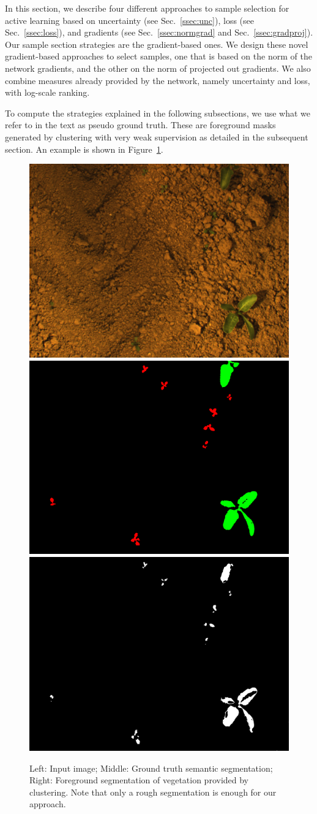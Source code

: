 \documentclass[letterpaper, 10 pt, conference]{ieeeconf}  %
\def\secref#1{Sec.~\ref{#1}}
\begin{document}
In this section, we describe four different approaches to sample selection for active learning based on uncertainty (see \secref{ssec:unc}), loss (see \secref{ssec:loss}), and gradients (see \secref{ssec:normgrad} and \secref{ssec:gradproj}).
Our  sample section strategies are the gradient-based ones.
We design these novel gradient-based approaches to select samples, one that is based on the norm of the network gradients, and the other on the norm of projected out gradients. We also combine measures already provided by the network, namely uncertainty and loss, with log-scale ranking. 
 

To compute the strategies explained in the following subsections, we use what we refer to in the text as pseudo ground truth. These are foreground masks generated by clustering with very weak supervision as detailed in the subsequent section. An example is shown in Figure~\ref{fig:unsupervised_foreground}.

\begin{figure}
    \centering
    \includegraphics[width=0.32\linewidth]{pics/unsupervised/img_masks_8mm_fromImages_frame256.png}
    \includegraphics[width=0.32\linewidth]{pics/unsupervised/gt_masks_8mm_fromImages_frame256_GroundTruth_iMap.png}
    \includegraphics[width=0.32\linewidth]{pics/unsupervised/lbl_masks_8mm_fromImages_frame256.png}
    \caption{Left: Input image; Middle: Ground truth semantic segmentation; Right: Foreground segmentation of vegetation provided by clustering. Note that only a rough segmentation is enough for our approach.}
    \label{fig:unsupervised_foreground}
\end{figure}
\end{document}
